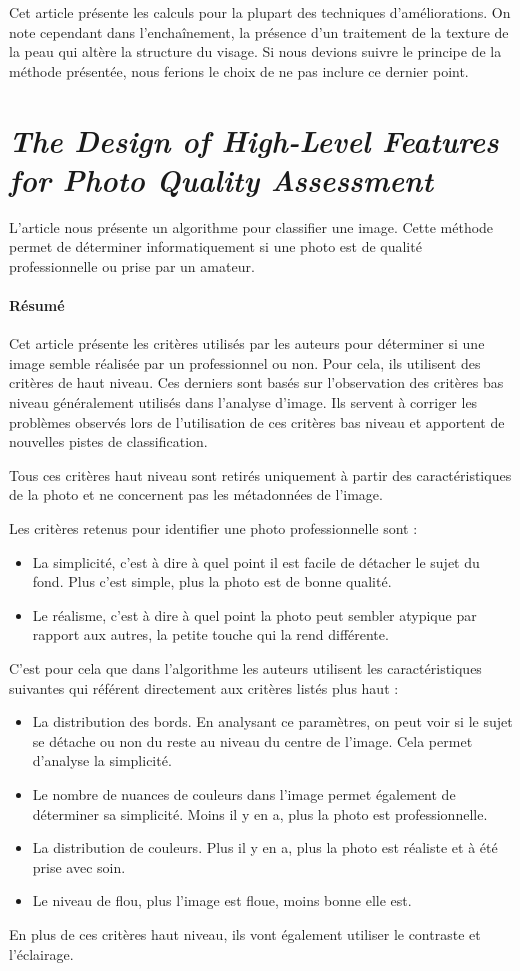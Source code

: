 \documentclass[11pt, french]{report-rd-info}
\begin{document}
Cet article présente les calculs pour la plupart des techniques d’améliorations. On note cependant dans l'enchaînement, la présence d’un traitement de la texture de la peau qui altère la structure du visage. Si nous devions suivre le principe de la méthode présentée, nous ferions le choix de ne pas inclure ce dernier point.


\section{\emph{The Design of High-Level Features for Photo Quality Assessment}}
L'article \cite{Ke} nous présente un algorithme pour classifier une image. Cette méthode permet de déterminer informatiquement si une photo est de qualité professionnelle ou prise par un amateur.

\paragraph{Résumé}
Cet article présente les critères utilisés par les auteurs pour déterminer si une image semble réalisée par un professionnel ou non. Pour cela, ils utilisent des critères de haut niveau. Ces derniers sont basés sur l'observation des critères bas niveau généralement utilisés dans l'analyse d'image. Ils servent à corriger les problèmes observés lors de l'utilisation de ces critères bas niveau et apportent de nouvelles pistes de classification.

Tous ces critères haut niveau sont retirés uniquement à partir des caractéristiques de la photo et ne concernent pas les métadonnées de l'image.

Les critères retenus pour identifier une photo professionnelle sont :
\begin{itemize}
\item La simplicité, c'est à dire à quel point il est facile de détacher le sujet du fond. Plus c'est simple, plus la photo est de bonne qualité.
\item Le réalisme, c'est à dire à quel point la photo peut sembler atypique par rapport aux autres, la petite touche qui la rend différente.
\end{itemize}
C'est pour cela que dans l'algorithme les auteurs utilisent les caractéristiques suivantes qui référent directement aux critères listés plus haut :
\begin{itemize}
\item La distribution des bords. En analysant ce paramètres, on peut voir si le sujet se détache ou non du reste au niveau du centre de l'image. Cela permet d'analyse la simplicité.
\item Le nombre de nuances de couleurs dans l'image permet également de déterminer sa simplicité. Moins il y en a, plus la photo est professionnelle.
\item La distribution de couleurs. Plus il y en a, plus la photo est réaliste et à été prise avec soin.
\item Le niveau de flou, plus l'image est floue, moins bonne elle est.
\end{itemize}
En plus de ces critères haut niveau, ils vont également utiliser le contraste et l'éclairage.
\end{document}
